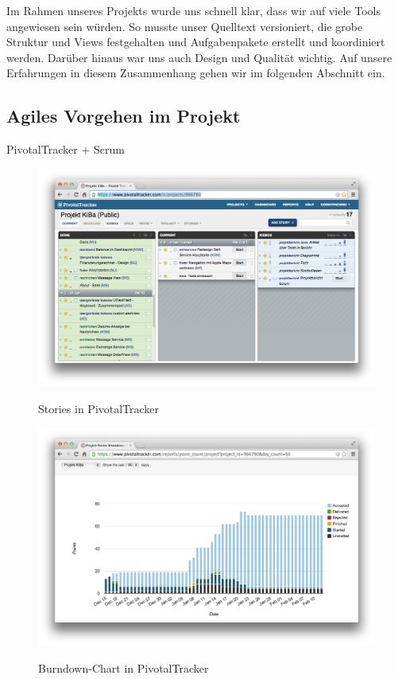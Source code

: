 Im Rahmen unseres Projekts wurde uns schnell klar, dass wir auf viele Tools angewiesen sein würden. So musste unser Quelltext versioniert, die grobe Struktur und Views festgehalten und Aufgabenpakete erstellt und koordiniert werden. Darüber hinaus war uns auch Design und Qualität wichtig. Auf unsere Erfahrungen in diesem Zusammenhang gehen wir im folgenden Abschnitt ein.

\subsection{Agiles Vorgehen im Projekt}
PivotalTracker + Scrum
\begin{figure}
	\centering
	\includegraphics[scale=.3]{Pictures/TrackerStories}
	\label{fig:TrackerStories}
	\caption{Stories in PivotalTracker}
\end{figure}
\begin{figure}
	\centering
	\includegraphics[scale=.3]{Pictures/TrackerBurndown}
	\label{fig:TrackerBurndown}
	\caption{Burndown-Chart in PivotalTracker}
\end{figure}

